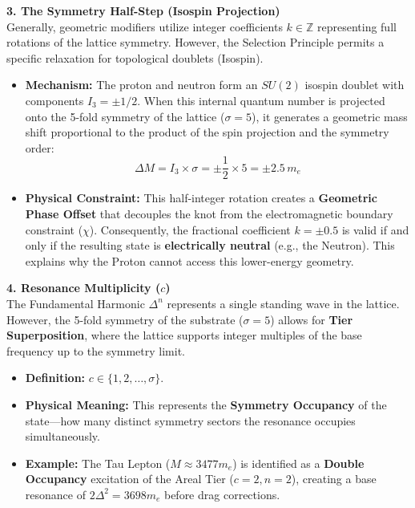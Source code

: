 \textbf{3. The Symmetry Half-Step (Isospin Projection)} \\
Generally, geometric modifiers utilize integer coefficients $k \in \mathbb{Z}$ representing full rotations of the lattice symmetry. However, the Selection Principle permits a specific relaxation for topological doublets (Isospin).
\begin{itemize}
    \item \textbf{Mechanism:} The proton and neutron form an $SU(2)$ isospin doublet with components $I_3 = \pm 1/2$. When this internal quantum number is projected onto the 5-fold symmetry of the lattice ($\sigma=5$), it generates a geometric mass shift proportional to the product of the spin projection and the symmetry order:
    \[ \Delta M = I_3 \times \sigma = \pm \frac{1}{2} \times 5 = \pm 2.5 \, m_e \]
    \item \textbf{Physical Constraint:} This half-integer rotation creates a \textbf{Geometric Phase Offset} that decouples the knot from the electromagnetic boundary constraint ($\chi$). Consequently, the fractional coefficient \textbf{$k = \pm 0.5$} is valid if and only if the resulting state is \textbf{electrically neutral} (e.g., the Neutron). This explains why the Proton cannot access this lower-energy geometry.
\end{itemize}

\textbf{4. Resonance Multiplicity ($c$)} \\
The Fundamental Harmonic $\Delta^n$ represents a single standing wave in the lattice. However, the 5-fold symmetry of the substrate ($\sigma=5$) allows for \textbf{Tier Superposition}, where the lattice supports integer multiples of the base frequency up to the symmetry limit.
\begin{itemize}
    \item \textbf{Definition:} $c \in \{1, 2, \dots, \sigma\}$.
    \item \textbf{Physical Meaning:} This represents the \textbf{Symmetry Occupancy} of the state—how many distinct symmetry sectors the resonance occupies simultaneously.
    \item \textbf{Example:} The Tau Lepton ($M \approx 3477 m_e$) is identified as a \textbf{Double Occupancy} excitation of the Areal Tier ($c=2, n=2$), creating a base resonance of $2\Delta^2 = 3698 m_e$ before drag corrections.
\end{itemize}

